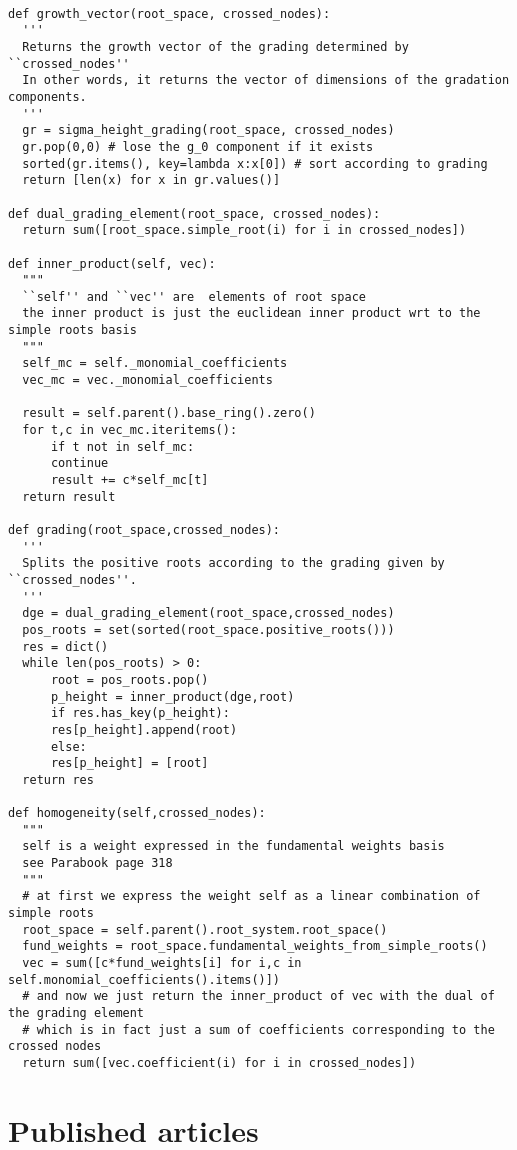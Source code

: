 \begin{appendices}
\begin{verbatim}
        
def growth_vector(root_space, crossed_nodes):
  '''
  Returns the growth vector of the grading determined by ``crossed_nodes''
  In other words, it returns the vector of dimensions of the gradation components.
  '''
  gr = sigma_height_grading(root_space, crossed_nodes)
  gr.pop(0,0) # lose the g_0 component if it exists
  sorted(gr.items(), key=lambda x:x[0]) # sort according to grading
  return [len(x) for x in gr.values()]

def dual_grading_element(root_space, crossed_nodes):
  return sum([root_space.simple_root(i) for i in crossed_nodes])
    
def inner_product(self, vec):
  """
  ``self'' and ``vec'' are  elements of root space 
  the inner product is just the euclidean inner product wrt to the simple roots basis
  """
  self_mc = self._monomial_coefficients
  vec_mc = vec._monomial_coefficients

  result = self.parent().base_ring().zero()
  for t,c in vec_mc.iteritems():
      if t not in self_mc:
	  continue
      result += c*self_mc[t]
  return result    
        
def grading(root_space,crossed_nodes):
  '''
  Splits the positive roots according to the grading given by ``crossed_nodes''.
  '''
  dge = dual_grading_element(root_space,crossed_nodes)
  pos_roots = set(sorted(root_space.positive_roots()))
  res = dict()
  while len(pos_roots) > 0:
      root = pos_roots.pop()
      p_height = inner_product(dge,root)
      if res.has_key(p_height):
	  res[p_height].append(root)
      else: 
	  res[p_height] = [root]
  return res    

def homogeneity(self,crossed_nodes):
  """
  self is a weight expressed in the fundamental weights basis
  see Parabook page 318
  """
  # at first we express the weight self as a linear combination of simple roots
  root_space = self.parent().root_system.root_space()
  fund_weights = root_space.fundamental_weights_from_simple_roots()
  vec = sum([c*fund_weights[i] for i,c in self.monomial_coefficients().items()])
  # and now we just return the inner_product of vec with the dual of the grading element 
  # which is in fact just a sum of coefficients corresponding to the crossed nodes
  return sum([vec.coefficient(i) for i in crossed_nodes])        
\end{verbatim}


\chapter{Published articles}
%
%
%
%

\end{appendices}